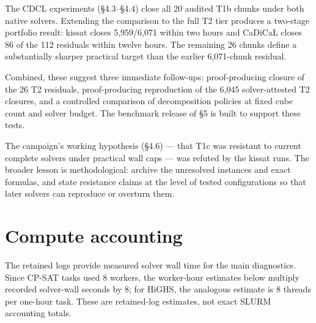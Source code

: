 The CDCL experiments (§4.3--§4.4) close all 20 audited T1b chunks under both
native solvers. Extending the comparison to the full T2 tier produces a
two-stage portfolio result: kissat closes 5,959/6,071 within two hours and
CaDiCaL closes 86 of the 112 residuals within twelve hours. The remaining
26 chunks define a substantially sharper practical target than the earlier
6,071-chunk residual.

Combined, these suggest three immediate follow-ups: proof-producing closure
of the 26 T2 residuals, proof-producing reproduction of the 6,045
solver-attested T2 closures, and a controlled comparison of decomposition
policies at fixed cube count and solver budget. The benchmark release of §5
is built to support these tests.

The campaign's working hypothesis (§4.6) --- that T1c was resistant to
current complete solvers under practical wall caps --- was refuted by the
kissat runs. The broader lesson is methodological: archive the unresolved
instances and exact formulas, and state resistance claims at the level of
tested configurations so that later solvers can reproduce or overturn them.

\appendix

\section{Compute accounting}\label{app:compute}

The retained logs provide measured solver wall time for the main diagnostics.
Since CP-SAT tasks used 8 workers, the worker-hour estimates below multiply
recorded solver-wall seconds by 8; for HiGHS, the analogous estimate is
8 threads per one-hour task. These are retained-log estimates, not exact
SLURM accounting totals.

